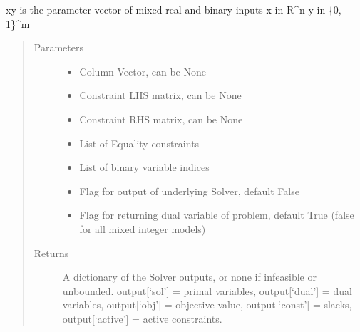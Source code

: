 \documentclass[letterpaper,10pt,english]{sphinxmanual}
\begin{document}
\begin{fulllineitems}
\begin{fulllineitems}
\begin{description}
\begin{description}
\sphinxAtStartPar
xy is the parameter vector of mixed real and binary inputs
x in R\textasciicircum{}n
y in \{0, 1\}\textasciicircum{}m

\end{description}

\end{description}
\begin{quote}\begin{description}
\item[{Parameters}] \leavevmode\begin{itemize}
\item {} 
\sphinxAtStartPar
{} \textendash{} Column Vector, can be None

\item {} 
\sphinxAtStartPar
{} \textendash{} Constraint LHS matrix, can be None

\item {} 
\sphinxAtStartPar
{} \textendash{} Constraint RHS matrix, can be None

\item {} 
\sphinxAtStartPar
{} \textendash{} List of Equality constraints

\item {} 
\sphinxAtStartPar
{} \textendash{} List of binary variable indices

\item {} 
\sphinxAtStartPar
{} \textendash{} Flag for output of underlying Solver, default False

\item {} 
\sphinxAtStartPar
{} \textendash{} Flag for returning dual variable of problem, default True (false for all mixed integer models)

\end{itemize}

\item[{Returns}] \leavevmode
\sphinxAtStartPar
A dictionary of the Solver outputs, or none if infeasible or unbounded. output{[}‘sol’{]} = primal variables, output{[}‘dual’{]} = dual variables, output{[}‘obj’{]} = objective value, output{[}‘const’{]} = slacks, output{[}‘active’{]} = active constraints.

\end{description}\end{quote}


\end{fulllineitems}
\end{fulllineitems}
\end{document}
